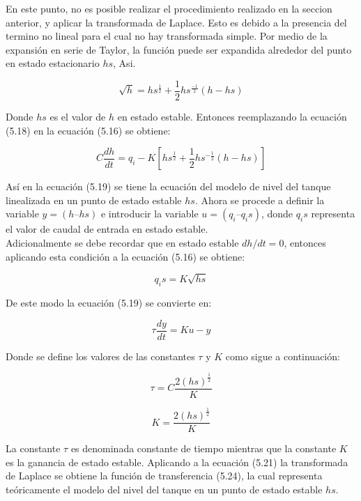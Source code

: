\documentclass[a4paper,12pt,twoside]{proyectotanquesecci}
\begin{document}
En este punto, no es posible realizar el procedimiento realizado en la seccion anterior, y aplicar la transformada de Laplace. Esto es debido a la presencia del termino no lineal para el cual no hay transformada simple. Por medio de la expansión en serie de Taylor, la función puede ser expandida alrededor del punto en estado estacionario $hs$, Asi.

\begin{equation}
\sqrt{h}=hs^{\frac{1}{2}}+\frac{1}{2}hs^{\frac{-1}{2}}(h-hs)
\end{equation}

Donde $hs$ es el valor de $h$ en estado estable. Entonces reemplazando la ecuación (5.18) en la ecuación (5.16) se obtiene:

\begin{equation}
C\frac{dh}{dt}=q_{i}-K\left[hs^{\frac{1}{2}}+\frac{1}{2} hs^{-\frac{1}{2}}\left(h-hs\right) \right]
\end{equation}

Así en la ecuación (5.19) se tiene la ecuación del modelo de nivel del tanque linealizada en un punto de estado estable $hs$. Ahora se procede a definir la variable $y=(h–hs)$ e introducir la variable $u=(q_{i}–q_{i}s)$, donde $q_{i}s$ representa el valor de caudal de entrada en estado estable. \\

Adicionalmente se debe recordar que en estado estable $dh/dt=0$, entonces aplicando esta condición a la ecuación (5.16) se obtiene:

\begin{equation}
q_{i}s=K\sqrt{hs}
\end{equation}

De este modo la ecuación (5.19) se convierte en:

\begin{equation}
\tau\frac{dy}{dt}=Ku-y
\end{equation}

Donde se define los valores de las constantes $\tau$ y $K$ como sigue a continuación:

\begin{equation}
\tau=C\frac{2(hs)^{\frac{1}{2}}}{K}
\end{equation}

\begin{equation}
K=\frac{2(hs)^{\frac{1}{2}}}{K}
\end{equation}

La constante $\tau$ es denominada constante de tiempo mientras que la constante $K$ es la ganancia de estado estable. Aplicando a la ecuación (5.21) la transformada de Laplace se obtiene la función de transferencia (5.24), la cual representa teóricamente el modelo del nivel del tanque en un punto de estado estable $hs$.
\end{document}
